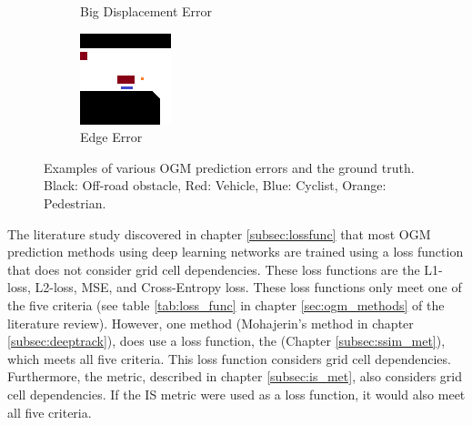\begin{figure}[h]
\begin{subfigure}[t]{0.25\linewidth}
		\caption{Big Displacement Error}
		\label{fig:met_crit_bdisp2}
	\end{subfigure} \hfil
	\begin{subfigure}[t]{0.25\linewidth}
		\includegraphics[width=\linewidth]{Figures/Res_Prop/Edge_colloquium}
		\caption{Edge Error}
		\label{fig:met_crit_edge2}
	\end{subfigure} \hfil
	\caption{Examples of various \gls{OGM} prediction errors and the ground truth. Black: Off-road obstacle, Red: Vehicle, Blue: Cyclist, Orange: Pedestrian.}
	\label{fig:met_crit2}
\end{figure}


The literature study discovered in chapter \ref{subsec:lossfunc} that most \gls{OGM} prediction methods using deep learning networks are trained using a loss function that does not consider grid cell dependencies. These loss functions are the L1-loss, L2-loss, \gls{MSE}, and Cross-Entropy loss. These loss functions only meet one of the five criteria (see table \ref{tab:loss_func} in chapter \ref{sec:ogm_methods} of the literature review). However, one method (Mohajerin's \cite{mohajerin2019multi} method in chapter \ref{subsec:deeptrack}), does use a loss function, the  (Chapter \ref{subsec:ssim_met}), which meets all five criteria. This loss function considers grid cell dependencies. Furthermore, the  metric, described in chapter \ref{subsec:is_met}, also considers grid cell dependencies. If the \gls{IS} metric were used as a loss function, it would also meet all five criteria. \\

